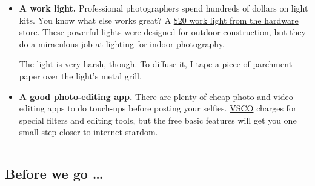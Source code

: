 \begin{itemize}
\item
  \textbf{A work light.} Professional photographers spend hundreds of
  dollars on light kits. You know what else works great? A
  \href{https://petapixel.com/2018/07/26/these-portraits-were-shot-with-a-20-work-light-from-home-depot/}{\$20
  work light from the hardware store}. These powerful lights were
  designed for outdoor construction, but they do a miraculous job at
  lighting for indoor photography.

  The light is very harsh, though. To diffuse it, I tape a piece of
  parchment paper over the light's metal grill.
\end{itemize}

\begin{itemize}
\tightlist
\item
  \textbf{A good photo-editing app.} There are plenty of cheap photo and
  video editing apps to do touch-ups before posting your selfies.
  \href{https://apps.apple.com/us/app/vsco-photo-video-editor/id588013838}{VSCO}
  charges for special filters and editing tools, but the free basic
  features will get you one small step closer to internet stardom.
\end{itemize}

\begin{center}\rule{0.5\linewidth}{\linethickness}\end{center}

\hypertarget{before-we-go-}{%
\subsection{Before we go \ldots{}}\label{before-we-go-}}

